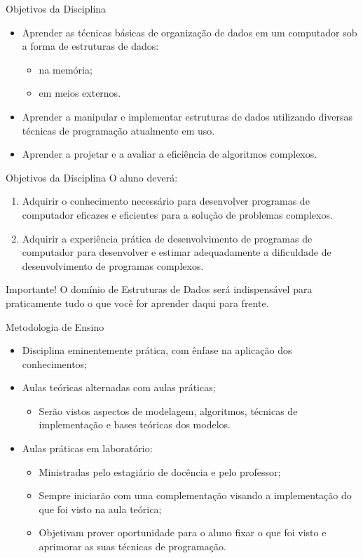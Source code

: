 \documentclass[12pt]{beamer}
\begin{document}
\begin{frame}{Objetivos da Disciplina}
\begin{itemize}
\item Aprender as técnicas básicas de organização de dados em um computador sob a forma de estruturas de dados:
\begin{itemize}
\item na memória;
\item em meios externos.
\end{itemize}
\item Aprender a manipular e implementar estruturas de dados utilizando diversas técnicas de programação atualmente em uso.
\item Aprender a projetar e a avaliar a eficiência de algoritmos complexos.
\end{itemize}
\end{frame}


\begin{frame}{Objetivos da Disciplina}
O aluno deverá:
\begin{enumerate}
\item Adquirir o conhecimento necessário para desenvolver programas de computador eficazes e eficientes para a solução de problemas complexos.
\item Adquirir a experiência prática de desenvolvimento de programas de computador para desenvolver e estimar adequadamente a dificuldade de desenvolvimento de programas complexos.
\end{enumerate}
\begin{block} {Importante!}
O domínio de Estruturas de Dados será indispensável para praticamente tudo o que você for aprender daqui para frente.
\end{block}
\end{frame}

\begin{frame}{Metodologia de Ensino}
\begin{itemize}
\item Disciplina eminentemente prática, com ênfase na aplicação dos conhecimentos;
\item Aulas teóricas alternadas com aulas práticas;
\begin{itemize}
\item Serão vistos aspectos de modelagem, algoritmos, técnicas de implementação e bases teóricas dos modelos.
\end{itemize}
\item Aulas práticas em laboratório:
\begin{itemize}
\item Ministradas pelo estagiário de docência e pelo professor;
\item Sempre iniciarão com uma complementação visando a implementação do que foi visto na aula teórica;
\item Objetivam prover oportunidade para o aluno fixar o que foi visto e aprimorar as suas técnicas de programação.
\end{itemize}
\end{itemize}
\end{frame}
\end{document}
